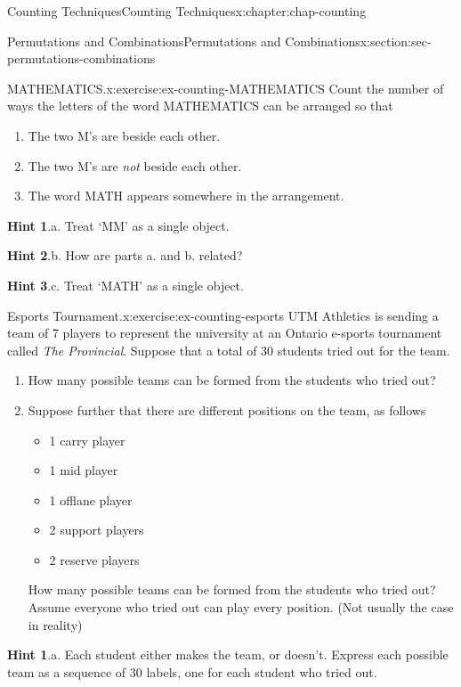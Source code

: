 \documentclass[oneside,10pt,]{book}
\newcommand{\blocktitlefont}{\relax}
\numberwithin{equation}{section}
\begin{document}
\begin{chapterptx}{Counting Techniques}{}{Counting Techniques}{}{}{x:chapter:chap-counting}
\begin{sectionptx}{Permutations and Combinations}{}{Permutations and Combinations}{}{}{x:section:sec-permutations-combinations}
\begin{inlineexercise}{MATHEMATICS.}{x:exercise:ex-counting-MATHEMATICS}
Count the number of ways the letters of the word MATHEMATICS can be arranged so that%
\begin{enumerate}[label=(\alph*)]
\item{}The two M's are beside each other.%
\item{}The two M's are \emph{not} beside each other.%
\item{}The word MATH appears somewhere in the arrangement.%
\end{enumerate}
%
\par\smallskip%
\noindent\textbf{\blocktitlefont Hint 1}.\hypertarget{g:hint:id471917}{}\quad{}a. Treat `MM' as a single object.%
\par\smallskip%
\noindent\textbf{\blocktitlefont Hint 2}.\hypertarget{g:hint:id471911}{}\quad{}b. How are parts a. and b. related?%
\par\smallskip%
\noindent\textbf{\blocktitlefont Hint 3}.\hypertarget{g:hint:id471893}{}\quad{}c. Treat `MATH' as a single object.%
\end{inlineexercise}
\begin{inlineexercise}{Esports Tournament.}{x:exercise:ex-counting-esports}%
UTM Athletics is sending a team of 7 players to represent the university at an Ontario e-sports tournament called \emph{The Provincial}. Suppose that a total of 30 students tried out for the team.%
\begin{enumerate}[label=(\alph*)]
\item{}How many possible teams can be formed from the students who tried out?%
\item{}Suppose further that there are different positions on the team, as follows%
\begin{itemize}[label=\textbullet]
\item{}1 carry player%
\item{}1 mid player%
\item{}1 offlane player%
\item{}2 support players%
\item{}2 reserve players%
\end{itemize}
How many possible teams can be formed from the students who tried out? Assume everyone who tried out can play every position. (Not usually the case in reality\textellipsis{})%
\end{enumerate}
%
\par\smallskip%
\noindent\textbf{\blocktitlefont Hint 1}.\hypertarget{g:hint:id472028}{}\quad{}a. Each student either makes the team, or doesn't. Express each possible team as a sequence of 30 labels, one for each student who tried out.%

\end{inlineexercise}
\end{sectionptx}
\end{chapterptx}
\end{document}
